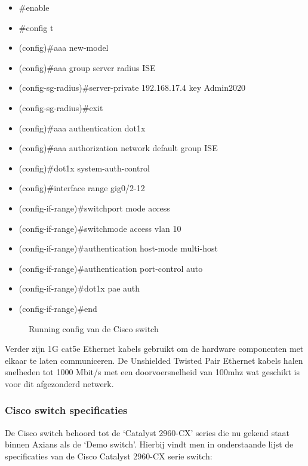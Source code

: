 \begin{itemize}
	\item \#enable
	\item \#config t
	\item (config)\#aaa new-model
	\item (config)\#aaa group server radius ISE
	\item (config-sg-radius)\#server-private 192.168.17.4 key Admin2020
	\item (config-sg-radius)\#exit
	\item (config)\#aaa authentication dot1x
	\item (config)\#aaa authorization network default group ISE
	\item (config)\#dot1x system-auth-control
	\item (config)\#interface range gig0/2-12
	\item (config-if-range)\#switchport mode access
	\item (config-if-range)\#switchmode access vlan 10
	\item (config-if-range)\#authentication host-mode multi-host
	\item (config-if-range)\#authentication port-control auto
	\item (config-if-range)\#dot1x pae auth
	\item (config-if-range)\#end
\end{itemize}

\begin{figure}[H]
	\centering
	\qquad
	\qquad
	\caption{Running config van de Cisco switch}%
	\label{fig:RunningConfig}%
\end{figure}
Verder zijn 1G cat5e Ethernet kabels gebruikt om de hardware componenten met elkaar te laten communiceren. De Unshielded Twisted Pair Ethernet kabels halen snelheden tot 1000 Mbit/s met een doorvoersnelheid van 100mhz wat geschikt is voor dit afgezonderd netwerk.

\subsubsection{Cisco switch specificaties}
De Cisco switch behoord tot de ‘Catalyst 2960-CX’ series die nu gekend staat binnen Axians als de ‘Demo switch’. Hierbij vindt men in onderstaande lijst de specificaties van de Cisco Catalyst 2960-CX serie switch:

